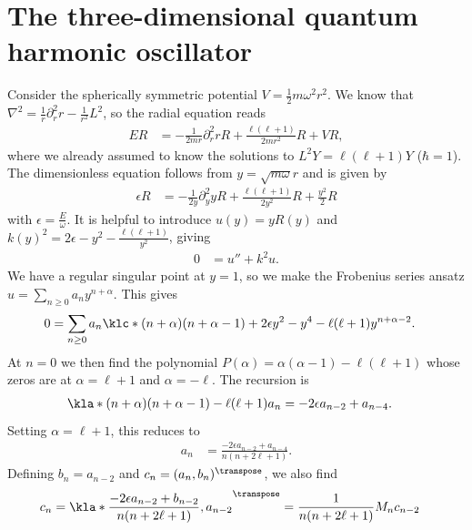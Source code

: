 \documentclass[english, parskip=full]{scrartcl}
\title{\Title}
\author{\Author}
\date{\today}
\begin{document}
\maketitle  %

\section{The three-dimensional quantum harmonic oscillator}
Consider the spherically symmetric potential $V=\frac{1}{2}m\omega^2r^2$.
We know that $\nabla^2=\frac{1}{r}\partial_r^2 r - \frac{1}{r^2}L^2$, so the radial equation reads
\begin{align}
ER &= -\frac{1}{2mr} \partial_r^2 rR + \frac{\ell(\ell+1)}{2mr^2} R + VR,
\end{align}
where we already assumed to know the solutions to $L^2Y = \ell(\ell+1)Y$ ($\hbar=1$).
The dimensionless equation follows from $y=\sqrt{m\omega} r$ and is given by
\begin{align}
\epsilon R &= -\frac{1}{2y} \partial_y^2 yR + \frac{\ell(\ell+1)}{2y^2}R + \frac{y^2}{2}R
\end{align}
with $\epsilon = \frac{E}{\omega}$.
It is helpful to introduce $u(y)=yR(y)$ and $k(y)^2 = 2\epsilon - y^2 - \frac{\ell(\ell+1)}{y^2}$, giving
\begin{align}
0 &= u'' + k^2u.
\end{align}
We have a regular singular point at $y=1$, so we make the Frobenius series ansatz $u=\sum_{n\ge 0} a_n y^{n+\alpha}$.
This gives
\begin{align}
0 &= \sum_{n\ge 0} a_n \klc*{(n+\alpha)(n+\alpha-1) + 2\epsilon y^2 - y^4 - \ell(\ell+1)} y^{n+\alpha-2}.
\end{align}
At $n=0$ we then find the polynomial $P(\alpha)=\alpha(\alpha-1) - \ell(\ell+1)$ whose zeros are at $\alpha=\ell+1$ and $\alpha=-\ell$.
The recursion is
\begin{align}
\kla*{(n+\alpha)(n+\alpha-1) - \ell(\ell+1)} a_n &= -2\epsilon a_{n-2} + a_{n-4}.
\end{align}
Setting $\alpha=\ell+1$, this reduces to
\begin{align}
a_n &= \frac{-2\epsilon a_{n-2} + a_{n-4}}{n(n+2\ell+1)}.
\end{align}
Defining $b_n=a_{n-2}$ and $c_n=(a_n,b_n)^\transpose$, we also find
\begin{align}
c_n &= \kla*{\frac{-2\epsilon a_{n-2} + b_{n-2}}{n(n+2\ell+1)}, a_{n-2}}^\transpose = \frac{1}{n(n+2\ell+1)} M_n c_{n-2}
\end{align}
\end{document}
